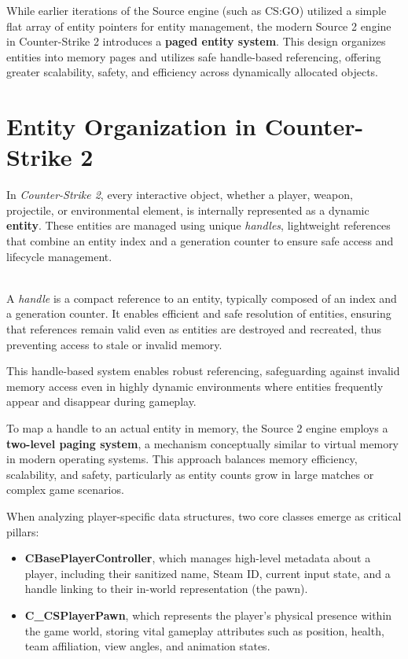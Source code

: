     
While earlier iterations of the Source engine (such as CS:GO) utilized a simple flat array of entity pointers for entity management, the modern Source 2 engine in Counter-Strike 2 introduces a \textbf{paged entity system}. This design organizes entities into memory pages and utilizes safe handle-based referencing, offering greater scalability, safety, and efficiency across dynamically allocated objects.    

\section{Entity Organization in Counter-Strike 2}

In \textit{Counter-Strike 2}, every interactive object, whether a player, weapon, projectile, or environmental element, is internally represented as a dynamic \textbf{entity}. These entities are managed using unique \textit{handles}, lightweight references that combine an entity index and a generation counter to ensure safe access and lifecycle management.

\begin{tcolorbox}[colback=gray!10, colframe=gray!50, boxrule=0pt, sharp corners, width=\linewidth, left=1mm, right=1mm, top=0.5mm, bottom=0.5mm]
 \\
A \textit{handle} is a compact reference to an entity, typically composed of an index and a generation counter. It enables efficient and safe resolution of entities, ensuring that references remain valid even as entities are destroyed and recreated, thus preventing access to stale or invalid memory.
\end{tcolorbox}


This handle-based system enables robust referencing, safeguarding against invalid memory access even in highly dynamic environments where entities frequently appear and disappear during gameplay.

To map a handle to an actual entity in memory, the Source 2 engine employs a \textbf{two-level paging system}, a mechanism conceptually similar to virtual memory in modern operating systems. This approach balances memory efficiency, scalability, and safety, particularly as entity counts grow in large matches or complex game scenarios.

When analyzing player-specific data structures, two core classes emerge as critical pillars:

\begin{itemize}
    \item \textbf{CBasePlayerController}, which manages high-level metadata about a player, including their sanitized name, Steam ID, current input state, and a handle linking to their in-world representation (the pawn).
    \item \textbf{C\_CSPlayerPawn}, which represents the player's physical presence within the game world, storing vital gameplay attributes such as position, health, team affiliation, view angles, and animation states.
\end{itemize}

